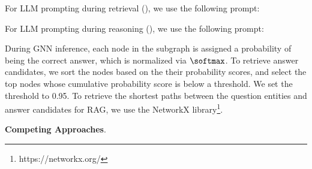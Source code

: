 For LLM prompting during retrieval (), we use the following prompt:
\begin{center}
\end{center}

For LLM prompting during reasoning (), we use the following prompt:
\begin{center}
\end{center}

During GNN inference, each node in the subgraph is assigned a probability of being the correct answer, which is normalized via $\softmax$. To retrieve answer candidates, we sort the nodes based on the their probability scores, and select the top nodes whose cumulative probability score is below a threshold. We set the threshold to 0.95. To retrieve the shortest paths between the question entities and answer candidates for RAG, we use the NetworkX library\footnote{https://networkx.org/}. 


\textbf{Competing Approaches}. 

